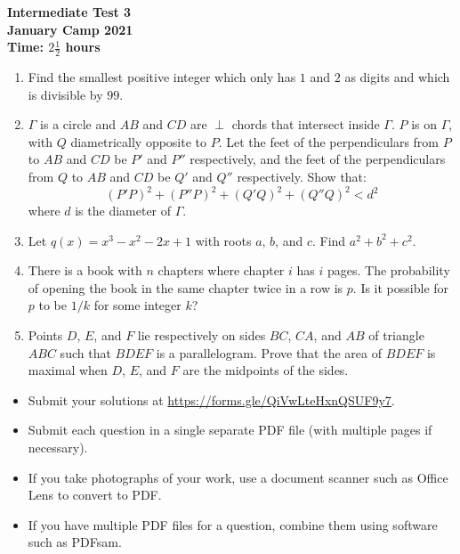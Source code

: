 \documentclass{article}
\begin{document}
\thispagestyle{empty}

\begin{center}
  \textbf{\Large Intermediate Test 3}
  \\ \vspace{1em}
  \textbf{\large January Camp 2021}
  \\ \vspace{1em}
  \textbf{\large Time: $2\frac{1}{2}$ hours}
\end{center}

\vspace{24pt}

\begin{enumerate}[1.]

\item %
Find the smallest positive integer which only has $1$ and $2$ as digits and which is divisible by $99$.


\item %
${\Gamma}$ is a circle and ${AB}$ and ${CD}$ are ${\perp}$ chords that intersect inside ${\Gamma}$. ${P}$ is on ${\Gamma}$, with ${Q}$ diametrically opposite to ${P}$. Let the feet of the perpendiculars from ${P}$ to ${AB}$ and ${CD}$ be ${P'}$ and ${P''}$ respectively, and the feet of the perpendiculars from ${Q}$ to ${AB}$ and ${CD}$ be ${Q'}$ and ${Q''}$ respectively. Show that: $${ (P'P)^2+(P''P)^2+(Q'Q)^2+(Q''Q)^2 < d^2}$$ where ${d}$ is the diameter of ${\Gamma}$.

\item %
Let $q(x) = x^3 -x^2 -2x +1$ with roots $a$, $b$, and $c$.
Find $a^2 +b^2 + c^2$.


\item %
There is a book with $n$ chapters where chapter $i$ has $i$ pages.
The probability of opening the book in the same chapter twice in a row is $p$.
Is it possible for $p$ to be $1/k$ for some integer $k$?


\item %
Points $D$, $E$, and $F$ lie respectively on sides $BC$, $CA$, and $AB$ of triangle $ABC$ such that $BDEF$ is a parallelogram. Prove that the area of $BDEF$ is maximal when $D$, $E$, and $F$ are the midpoints of the sides.


\end{enumerate}


\vfill
\begin{itemize}
	\item Submit your solutions at \url{https://forms.gle/QiVwLteHxnQSUF9y7}.
	\item Submit each question in a single separate PDF file (with multiple pages if necessary).
	\item If you take photographs of your work, use a document scanner such as Office Lens to convert to PDF.
	\item If you have multiple PDF files for a question, combine them using software such as PDFsam.
\end{itemize}

\vfill
\centering
\begin{BVerbatim}
\end{BVerbatim}
\end{document}
